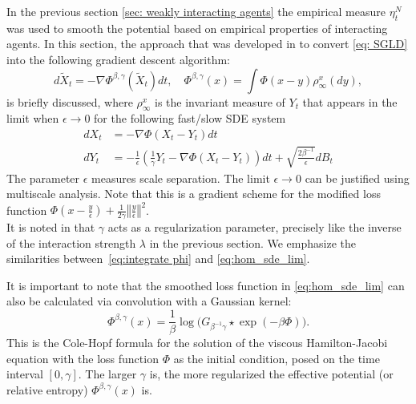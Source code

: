 \documentclass{article}
\begin{document}
In the previous section \ref{sec: weakly interacting agents} the empirical measure $\eta_{t}^{N}$ was used
to smooth the potential based on empirical properties of interacting
agents. In this section, the approach that
was developed in \cite{Chaudhari2017DeepRP} to convert \ref{eq: SGLD}
into the following gradient descent algorithm: 
\begin{equation}
d\tilde{X}_{t}=-\nabla\Phi^{\beta,\gamma}(\tilde{X}_{t})dt,\quad\Phi^{\beta,\gamma}\left(x\right)=\int\Phi(x-y)\rho_{\infty}^{x}(dy),\label{eq:hom_sde_lim}
\end{equation}
is briefly discussed, where $\rho_{\infty}^{x}$ is the invariant measure of $Y_{t}$ that
appears in the limit when $\epsilon\rightarrow0$ for the following
fast/slow SDE system \begin{subequations}\label{eq:hom_sde_v2} 
\begin{align}
dX_{t} & =-\nabla\Phi(X_{t}-Y_{t})dt\label{eq:hom_sde_v2_1}\\
dY_{t} & =-\frac{1}{\epsilon}\left(\frac{1}{\gamma}Y_{t}-\nabla\Phi(X_{t}-Y_{t})\right)dt+\sqrt{\frac{2\beta^{-1}}{\epsilon}}dB_{t}\label{eq:hom_sde_v2_2}
\end{align}
\end{subequations}The parameter $\epsilon$ measures scale separation.
The limit $\epsilon\rightarrow0$ can be justified using multiscale
analysis. Note that this is a gradient
scheme for the modified loss function $\Phi(x-\frac{y}{\epsilon})+\frac{1}{2\gamma}\left\Vert \frac{y}{\epsilon}\right\Vert ^{2}$.\\ 

It is noted in \cite{kantas2019sharpflatshallowweakly} that $\gamma$ acts as a regularization parameter, precisely like the inverse of the interaction strength $\lambda$
in the previous section. We emphasize the similarities between~\ref{eq:integrate phi}
and \ref{eq:hom_sde_lim}.

It is important to note that the smoothed loss function in \ref{eq:hom_sde_lim}
can also be calculated via convolution with a Gaussian kernel: 
\begin{equation}
\Phi^{\beta,\gamma}(x)=\frac{1}{\beta}\log\Big(G_{\beta^{-1}\gamma}\star\exp(-\beta\Phi)\Big).\label{e:phi-cole-hopf}
\end{equation}
This is the Cole-Hopf formula for the solution of the viscous Hamilton-Jacobi
equation with the loss function $\Phi$ as the initial condition,
posed on the time interval $[0,\gamma]$. The larger $\gamma$ is,
the more regularized the effective potential (or relative entropy)
$\Phi^{\beta,\gamma}(x)$ is. \\ 
\end{document}
